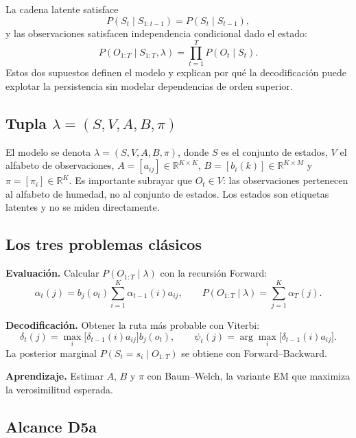 \documentclass[11pt,letterpaper]{article}
\begin{document}
La cadena latente satisface
\begin{equation}
P(S_t\mid S_{1:t-1})=P(S_t\mid S_{t-1}),
\end{equation}
y las observaciones satisfacen independencia condicional dado el estado:
\begin{equation}
P(O_{1:T}\mid S_{1:T},\lambda)=\prod_{t=1}^{T}P(O_t\mid S_t).
\end{equation}
Estos dos supuestos definen el modelo y explican por qué la decodificación puede explotar la persistencia sin modelar dependencias de orden superior.

\subsection{Tupla \(\lambda=(S,V,A,B,\pi)\)}

El modelo se denota \(\lambda=(S,V,A,B,\pi)\), donde \(S\) es el conjunto de estados, \(V\) el alfabeto de observaciones, \(A=[a_{ij}]\in\mathbb{R}^{K\times K}\), \(B=[b_i(k)]\in\mathbb{R}^{K\times M}\) y \(\pi=[\pi_i]\in\mathbb{R}^{K}\). Es importante subrayar que \(O_t\in V\): las observaciones pertenecen al alfabeto de humedad, no al conjunto de estados. Los estados son etiquetas latentes y no se miden directamente.

\subsection{Los tres problemas clásicos}

\textbf{Evaluación.} Calcular \(P(O_{1:T}\mid\lambda)\) con la recursión Forward:
\begin{equation}
\alpha_t(j)=b_j(o_t)\sum_{i=1}^{K}\alpha_{t-1}(i)a_{ij},
\qquad
P(O_{1:T}\mid\lambda)=\sum_{j=1}^{K}\alpha_T(j).
\end{equation}

\textbf{Decodificación.} Obtener la ruta más probable con Viterbi:
\begin{equation}
\delta_t(j)=\max_i\bigl[\delta_{t-1}(i)a_{ij}\bigr]b_j(o_t),
\qquad
\psi_t(j)=\arg\max_i\bigl[\delta_{t-1}(i)a_{ij}\bigr].
\end{equation}
La posterior marginal \(P(S_t=s_i\mid O_{1:T})\) se obtiene con Forward--Backward.

\textbf{Aprendizaje.} Estimar \(A\), \(B\) y \(\pi\) con Baum--Welch, la variante EM que maximiza la verosimilitud esperada.

\subsection{Alcance D5a}
\end{document}
